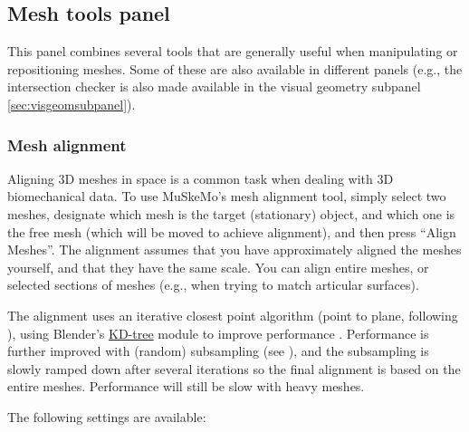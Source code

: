 \documentclass{article}
\begin{document}
\subsection{Mesh tools panel}
\label{sec:meshtools}
This panel combines several tools that are generally useful when manipulating or repositioning meshes. Some of these are also available in different panels (e.g., the intersection checker is also made available in the visual geometry subpanel \ref{sec:visgeomsubpanel}).

\subsubsection{Mesh alignment}
\label{sec:meshalignment}

Aligning 3D meshes in space is a common task when dealing with 3D biomechanical data. To use MuSkeMo's mesh alignment tool, simply select two meshes, designate which mesh is the target (stationary) object, and which one is the free mesh (which will be moved to achieve alignment), and then press ``Align Meshes''. The alignment assumes that you have approximately aligned the meshes yourself, and that they have the same scale. You can align entire meshes, or selected sections of meshes (e.g., when trying to match articular surfaces). 

The alignment uses an iterative closest point algorithm (point to plane, following \cite{chenObjectModelingRegistration1991}), using Blender's \href{https://docs.blender.org/api/current/mathutils.kdtree.html}{KD-tree} module to improve performance \cite{zhangIterativePointMatching1994}. Performance is further improved with (random) subsampling (see \cite{rusinkiewiczEfficientVariantsICP2001}), and the subsampling is slowly ramped down after several iterations so the final alignment is based on the entire meshes. Performance will still be slow with heavy meshes.

The following settings are available:
\end{document}
